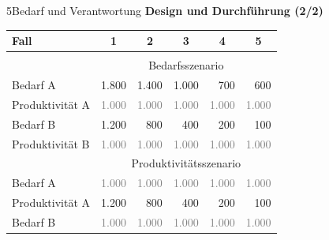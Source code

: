 \documentclass[xcolor=table,9pt,aspectratio=169]{beamer}
\begin{document}
\begin{frame}{\vspace*{10mm}5\hspace*{1em}Bedarf und Verantwortung}
\textbf{Design und Durchführung (2/2)}\\
\medskip
\begin{center}
   \begin{tabular}{lrrrrr}
      \arrayrulecolor{blue2}
      \hline
      Fall                      & \multicolumn{1}{c}{1}     & \multicolumn{1}{c}{2}     & \multicolumn{1}{c}{3}     & \multicolumn{1}{c}{4}   & \multicolumn{1}{c}{5}       \\
      \hline\hline\\[-0.5em]
                                & \multicolumn{5}{c}{Bedarfsszenario}                                                                                                       \\[0.5em]
      Bedarf A                  &                  1.800    &                  1.400    &                  1.000    &                    700    &                    600    \\
      Produktivität A           & \textcolor{gray}{1.000}   & \textcolor{gray}{1.000}   & \textcolor{gray}{1.000}   & \textcolor{gray}{1.000}   & \textcolor{gray}{1.000}   \\[0.5em]
      Bedarf B                  &                  1.200    &                    800    &                    400    &                    200    &                    100    \\
      Produktivität B           & \textcolor{gray}{1.000}   & \textcolor{gray}{1.000}   & \textcolor{gray}{1.000}   & \textcolor{gray}{1.000}   & \textcolor{gray}{1.000}   \\
      \hline
                                & \multicolumn{5}{c}{Produktivitätsszenario}                                                                                                \\[0.5em]
      Bedarf A                  & \textcolor{gray}{1.000}   & \textcolor{gray}{1.000}   & \textcolor{gray}{1.000}   & \textcolor{gray}{1.000}   & \textcolor{gray}{1.000}   \\
      Produktivität A           &                  1.200    &                    800    &                    400    &                    200    &                    100    \\[0.5em]
      Bedarf B                  & \textcolor{gray}{1.000}   & \textcolor{gray}{1.000}   & \textcolor{gray}{1.000}   & \textcolor{gray}{1.000}   & \textcolor{gray}{1.000}   \\

\end{tabular}
\end{center}
\end{frame}
\end{document}
